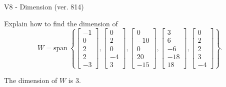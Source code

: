 \begin{exercise}
  \begin{exerciseTitle}V8 - Dimension (ver. 814)\end{exerciseTitle}
  \begin{exerciseStatement}
    Explain how to find the dimension of 
\[W=\mathrm{span}\ \left\{\left[\begin{array}{r}
-1 \\
0 \\
2 \\
2 \\
-3
\end{array}\right] , \left[\begin{array}{r}
0 \\
2 \\
0 \\
-4 \\
3
\end{array}\right] , \left[\begin{array}{r}
0 \\
-10 \\
0 \\
20 \\
-15
\end{array}\right] , \left[\begin{array}{r}
3 \\
6 \\
-6 \\
-18 \\
18
\end{array}\right] , \left[\begin{array}{r}
0 \\
2 \\
2 \\
3 \\
-4
\end{array}\right]\right\}.\]



  \end{exerciseStatement}
  \begin{exerciseAnswer}
   The dimension of \(W\) is  \(3\).
  


  \end{exerciseAnswer}
\end{exercise}